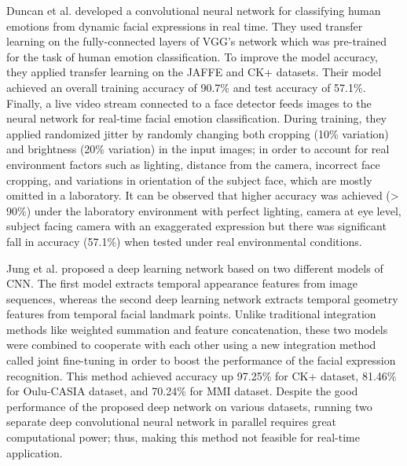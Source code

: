 \documentclass[master]{thesis-uestc}
\begin{document}
Duncan et al.\cite{duncan2016} developed a convolutional neural network for classifying human emotions from dynamic facial expressions in real time. They used transfer learning on the fully-connected layers of VGG's network which was pre-trained for the task of human emotion classification. To improve the model accuracy, they applied transfer learning on the JAFFE\cite{Michael-2017} and CK+ datasets. Their model achieved an overall training accuracy of 90.7\% and test accuracy of 57.1\%. Finally, a live video stream connected to a face detector feeds images to the neural network for real-time facial emotion classification. During training, they applied randomized jitter by randomly changing both cropping (10\% variation) and brightness (20\% variation) in the input images; in order to account for real environment factors such as lighting, distance from the camera, incorrect face cropping, and variations in orientation of the subject face, which are mostly omitted in a laboratory. It can be observed that higher accuracy was achieved (> 90\%) under the laboratory environment with perfect lighting, camera at eye level, subject facing camera with an exaggerated expression but there was significant fall in accuracy (57.1\%) when tested under real environmental conditions.

Jung et al.\cite{7410698} proposed a deep learning network based on two different models of CNN. The first model extracts temporal appearance features from image sequences, whereas the second deep learning network extracts temporal geometry features from temporal facial landmark points. Unlike traditional integration methods like weighted summation and feature concatenation, these two models were combined to cooperate with each other using a new integration method called joint fine-tuning in order to boost the performance of the facial expression recognition. This method achieved accuracy up 97.25\% for CK+ dataset, 81.46\% for Oulu-CASIA dataset\cite{ZHAO2011607}, and 70.24\% for MMI dataset\cite{1521424, Valstar10induceddisgust}. Despite the good performance of the proposed deep network on various datasets, running two separate deep convolutional neural network in parallel requires great computational power; thus, making this method not feasible for real-time application.
\end{document}

